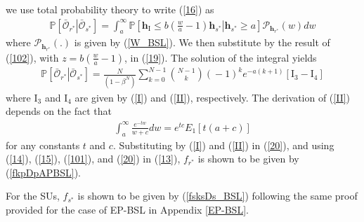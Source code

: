 \documentclass[journal,twocolumn]{IEEEtran}
\begin{document}
we use total probability theory to write (\ref{16}) as
\begin{align}\label{19}
\mathbb{P}\!\left[\! \left. \bar{\mathcal{O}}_{r^*}\! \right| \bar{\mathcal{O}}_{s^*}\!\right]\!\!=\!\!\! 
\int_{a}^{\infty}\!\!\!\!\!
\mathbb{P}\!\left[ \mathbf{h}_{\mathrm{I}}  \leq\! \left. b\left( \frac{w}{a}-1 \right) \mathbf{h}_{s^*}
\right| \mathbf{h}_{s^*} \geq a \right]\!\mathcal{P}_{\mathbf{h}_{r^*}}\!(w)dw
\end{align}
where $\mathcal{P}_{\mathbf{h}_{r^*}}(.)$ is given by (\ref{W_BSL}). We then substitute by the result of (\ref{102}), with $z=b\left( \frac{w}{a}-1 \right)$, in (\ref{19}). The solution of the integral yields 
\begin{align}\label{20}
\mathbb{P}\!\left[\! \left. \bar{\mathcal{O}}_{r^*}\! \right|\! \bar{\mathcal{O}}_{s^*}\!\right]\!\!=\!\! 
\frac{N}{\left(1-\beta^N\right)}
\!\!\displaystyle \sum_{k=0}^{N-1}\!\! {\!N\!-\!1\! \choose\! k\!} (\!-1\!)^{k} e^{-a(k+1)} 
\!\left[ \mathrm{I}_{3}\! -\! \mathrm{I}_{4} \right]
\end{align}
where $\mathrm{I}_{3}$ and $\mathrm{I}_{4}$ are given by (\ref{I}) and (\ref{II}), respectively. The derivation of (\ref{II}) depends on the fact that
\begin{align}\label{integration}
\int_{a}^{\infty} \frac{e^{-tw}}{w+c}dw=e^{tc}E_{1}[t(a+c)]
\end{align}
for any constants $t$ and $c$. Substituting by (\ref{I}) and (\ref{II}) in (\ref{20}), and using (\ref{14}), (\ref{15}), (\ref{101}), and (\ref{20}) in (\ref{13}), $f_{r^*}$ is shown to be given by (\ref{fkpDpAPBSL}).

For the SUs, $f_{s^*}$ is shown to be given by (\ref{fsksDs_BSL}) following the same proof provided for the case of EP-BSL in Appendix \ref{EP-BSL}.
\end{document}
